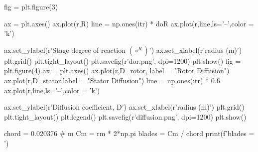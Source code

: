 \documentclass[conf]{new-aiaa}
\begin{document}
\begin{python}
fig = plt.figure(3)


ax = plt.axes()
ax.plot(r,R)
line = np.ones(itr) * doR
ax.plot(r,line,ls='--',color = 'k')


ax.set_ylabel(r'Stage degree of reaction $ \left(\circ^ R \right)$')
ax.set_xlabel(r'radius (m)')
plt.grid()
plt.tight_layout()
plt.savefig(r'dor.png', dpi=1200)
plt.show()
fig = plt.figure(4)
ax = plt.axes()
ax.plot(r,D_rotor, label = "Rotor Diffusion")
ax.plot(r,D_stator,label = "Stator Diffusion")
line = np.ones(itr) * 0.6
ax.plot(r,line,ls='--',color = 'k')


ax.set_ylabel(r'Diffusion coefficient, D')
ax.set_xlabel(r'radius (m)')
plt.grid()
plt.tight_layout()
plt.legend()
plt.savefig(r'diffusion.png', dpi=1200)
plt.show()

chord = 0.020376 # m
Cm = rm * 2*np.pi
blades = Cm / chord
print(f'{blades = }')
\end{python}
\end{document}
